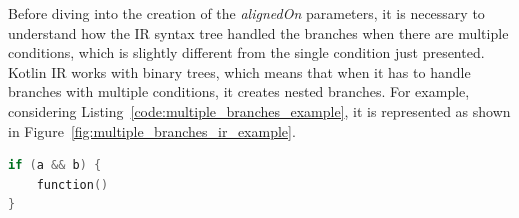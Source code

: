 Before diving into the creation of the \textit{alignedOn} parameters, it is necessary to understand how the IR syntax tree handled the branches when there are multiple conditions, which is slightly different from the single condition just presented. Kotlin IR works with binary trees, which means that when it has to handle branches with multiple conditions, it creates nested branches.\newline
For example, considering Listing~\ref{code:multiple_branches_example}, it is represented as shown in Figure~\ref{fig:multiple_branches_ir_example}.
\begin{lstlisting}[caption={Example of code where a branch has multiple conditions}, captionpos=b, language=Kotlin, label={code:multiple_branches_example}]
if (a && b) {
    function()
}
\end{lstlisting}

